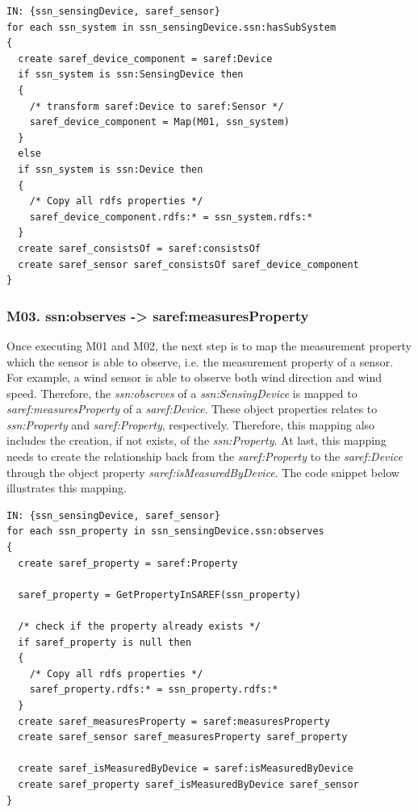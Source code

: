 \documentclass{sig-alternate-05-2015}
\begin{document}
\begin{lstlisting}[caption={Pseudocode snippet for M02},label={code:sample}]
IN: {ssn_sensingDevice, saref_sensor}
for each ssn_system in ssn_sensingDevice.ssn:hasSubSystem 
{ 
  create saref_device_component = saref:Device 
  if ssn_system is ssn:SensingDevice then 
  { 
    /* transform saref:Device to saref:Sensor */
    saref_device_component = Map(M01, ssn_system) 
  } 
  else 
  if ssn_system is ssn:Device then 
  { 
    /* Copy all rdfs properties */ 
    saref_device_component.rdfs:* = ssn_system.rdfs:* 
  } 
  create saref_consistsOf = saref:consistsOf 
  create saref_sensor saref_consistsOf saref_device_component 
}
\end{lstlisting}

\subsubsection{M03. ssn:observes -> saref:measuresProperty}
Once executing M01 and M02, the next step is to map the measurement property which the sensor is able to observe, i.e. the measurement property of a sensor. For example, a wind sensor is able to observe both wind direction and wind speed. Therefore, the \textit{ssn:observes} of a \textit{ssn:SensingDevice} is mapped to \textit{saref:measuresProperty} of a \textit{saref:Device}. These object properties relates to \textit{ssn:Property} and \textit{saref:Property}, respectively. Therefore, this mapping also includes the creation, if not exists, of the \textit{ssn:Property}. At last, this mapping needs to create the relationship back from the \textit{saref:Property} to the \textit{saref:Device} through the object property \textit{saref:isMeasuredByDevice}. The code snippet below illustrates this mapping. 

\begin{lstlisting}[caption={Pseudocode snippet for M02},label={code:sample}]
IN: {ssn_sensingDevice, saref_sensor}
for each ssn_property in ssn_sensingDevice.ssn:observes 
{ 
  create saref_property = saref:Property 
  
  saref_property = GetPropertyInSAREF(ssn_property)
    
  /* check if the property already exists */
  if saref_property is null then 
  { 
    /* Copy all rdfs properties */ 
    saref_property.rdfs:* = ssn_property.rdfs:* 
  } 
  create saref_measuresProperty = saref:measuresProperty 
  create saref_sensor saref_measuresProperty saref_property 
  
  create saref_isMeasuredByDevice = saref:isMeasuredByDevice
  create saref_property saref_isMeasuredByDevice saref_sensor
}
\end{lstlisting}
\end{document}
